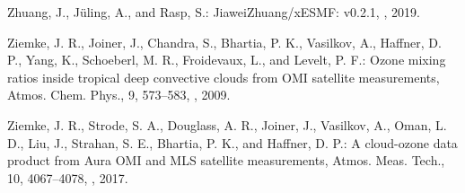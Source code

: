 \documentclass[amt]{copernicus}
\begin{document}
\begin{thebibliography}{105}
{Zhuang}, J., Jüling, A., and Rasp, S.: JiaweiZhuang/xESMF: v0.2.1,
  , 2019.

Ziemke, J. R., Joiner, J., Chandra, S., Bhartia, P. K., Vasilkov, A., Haffner, D. P., Yang, K., Schoeberl, M. R., Froidevaux, L., and Levelt, P. F.: Ozone mixing ratios inside tropical deep convective clouds from OMI satellite measurements, Atmos. Chem. Phys., 9, 573–583, , 2009.

Ziemke, J. R., Strode, S. A., Douglass, A. R., Joiner, J., Vasilkov, A., Oman, L. D., Liu, J., Strahan, S. E., Bhartia, P. K., and Haffner, D. P.: A cloud-ozone data product from Aura OMI and MLS satellite measurements, Atmos. Meas. Tech., 10, 4067–4078, , 2017.

\end{thebibliography}
\end{document}
